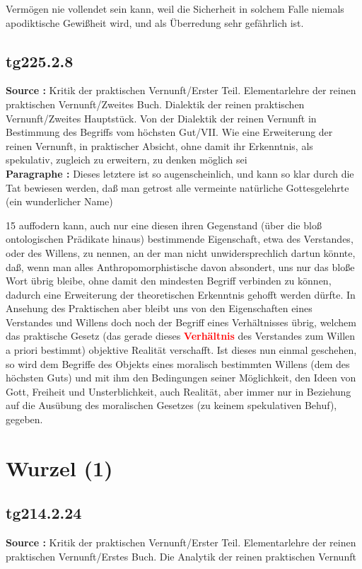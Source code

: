 \documentclass[a4paper,12pt,twoside]{book}
\newcommand{\match}[1]{\textcolor{red}{\textbf{#1}}}
\newcommand{\unnumberedsection}[1]{
	\section*{#1}
	\addcontentsline{toc}{section}{#1}
	\markright{#1}
}
\begin{document}
Vermögen nie vollendet sein kann, weil die Sicherheit in solchem Falle niemals apodiktische Gewißheit wird, und als Überredung sehr gefährlich ist. 
	
	\subsection*{tg225.2.8} 
	\textbf{Source : }Kritik der praktischen Vernunft/Erster Teil. Elementarlehre der reinen praktischen Vernunft/Zweites Buch. Dialektik der reinen praktischen Vernunft/Zweites Hauptstück. Von der Dialektik der reinen Vernunft in Bestimmung des Begriffs vom höchsten Gut/VII. Wie eine Erweiterung der reinen Vernunft, in praktischer Absicht, ohne damit ihr Erkenntnis, als spekulativ, zugleich zu erweitern, zu denken möglich sei\\  
	
	\textbf{Paragraphe : }Dieses letztere ist so augenscheinlich, und kann so klar durch die Tat bewiesen werden, daß man getrost alle vermeinte natürliche Gottesgelehrte (ein wunderlicher Name)
	
	
	15
	auffodern kann, auch nur eine diesen ihren Gegenstand (über die bloß ontologischen Prädikate hinaus) bestimmende Eigenschaft, etwa des Verstandes, oder des Willens, zu nennen, an der man nicht unwidersprechlich dartun könnte, daß, wenn man alles Anthropomorphistische davon absondert, uns nur das bloße Wort übrig bleibe, ohne damit den mindesten Begriff verbinden zu können, dadurch eine Erweiterung der theoretischen Erkenntnis gehofft werden dürfte. In Ansehung des Praktischen aber bleibt uns von den Eigenschaften eines Verstandes und Willens doch noch der Begriff eines Verhältnisses übrig, welchem das praktische Gesetz (das gerade dieses \match{Verhältnis} des Verstandes zum Willen a priori bestimmt) objektive Realität verschafft. Ist dieses nun einmal geschehen, so wird dem Begriffe des Objekts eines moralisch bestimmten Willens (dem des höchsten Guts) und mit ihm den Bedingungen seiner Möglichkeit, den Ideen von Gott, Freiheit und Unsterblichkeit, auch Realität, aber immer nur in Beziehung auf die Ausübung des moralischen Gesetzes (zu keinem spekulativen Behuf), gegeben. 
	
	\unnumberedsection{Wurzel (1)} 
	\subsection*{tg214.2.24} 
	\textbf{Source : }Kritik der praktischen Vernunft/Erster Teil. Elementarlehre der reinen praktischen Vernunft/Erstes Buch. Die Analytik der reinen praktischen Vernunft\\  
	
\end{document}
